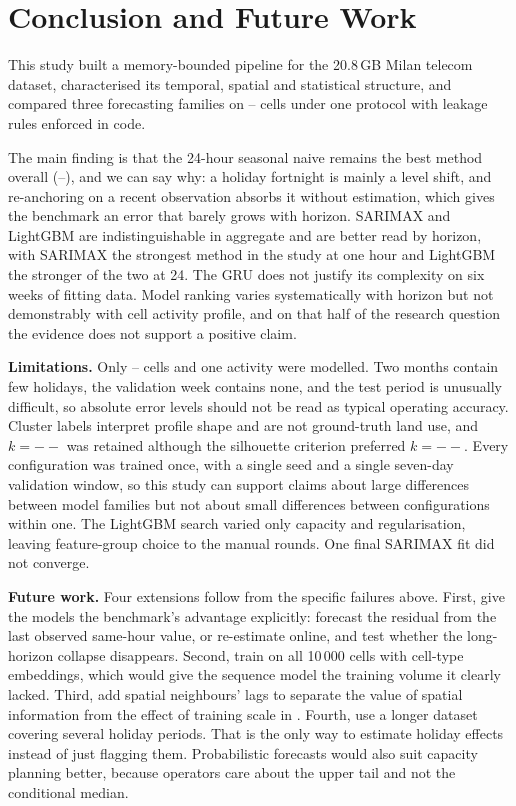 \documentclass[conference,onecolumn,11pt]{IEEEtran}
\providecommand{\nSelected}{--}
\providecommand{\bestK}{--}
\providecommand{\chosenK}{--}
\providecommand{\maseSeasonalNaiveAll}{--}
\begin{document}
\section{Conclusion and Future Work}
This study built a memory-bounded pipeline for the 20.8\,GB Milan telecom dataset, characterised its temporal, spatial and statistical structure, and compared three forecasting families on \nSelected{} cells under one protocol with leakage rules enforced in code.

The main finding is that the 24-hour seasonal naive remains the best method overall (\maseSeasonalNaiveAll{}), and we can say why: a holiday fortnight is mainly a level shift, and re-anchoring on a recent observation absorbs it without estimation, which gives the benchmark an error that barely grows with horizon. SARIMAX and LightGBM are indistinguishable in aggregate and are better read by horizon, with SARIMAX the strongest method in the study at one hour and LightGBM the stronger of the two at 24. The GRU does not justify its complexity on six weeks of fitting data. Model ranking varies systematically with horizon but not demonstrably with cell activity profile, and on that half of the research question the evidence does not support a positive claim.

\textbf{Limitations.} Only \nSelected{} cells and one activity were modelled. Two months contain few holidays, the validation week contains none, and the test period is unusually difficult, so absolute error levels should not be read as typical operating accuracy. Cluster labels interpret profile shape and are not ground-truth land use, and $k=\chosenK$ was retained although the silhouette criterion preferred $k=\bestK$. Every configuration was trained once, with a single seed and a single seven-day validation window, so this study can support claims about large differences between model families but not about small differences between configurations within one. The LightGBM search varied only capacity and regularisation, leaving feature-group choice to the manual rounds. One final SARIMAX fit did not converge.

\textbf{Future work.} Four extensions follow from the specific failures above. First, give the models the benchmark's advantage explicitly: forecast the residual from the last observed same-hour value, or re-estimate online, and test whether the long-horizon collapse disappears. Second, train on all 10\,000 cells with cell-type embeddings, which would give the sequence model the training volume it clearly lacked. Third, add spatial neighbours' lags to separate the value of spatial information from the effect of training scale in \cite{wang2017,zhang2018}. Fourth, use a longer dataset covering several holiday periods. That is the only way to estimate holiday effects instead of just flagging them. Probabilistic forecasts would also suit capacity planning better, because operators care about the upper tail and not the conditional median.
\end{document}

